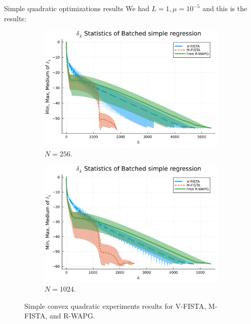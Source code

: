 \documentclass[11pt]{beamer}
\theoremstyle{definition}
\begin{document}
        \begin{frame}{Simple quadratic optimizations results}
            We had $L = 1, \mu = 10^{-5}$ and this is the results: 
            \begin{figure}[H]
                \begin{subfigure}[b]{0.47\textwidth}
                    \centering 
                    \includegraphics[width=\textwidth]{assets/simple_regression_batched-256.png}
                    \caption{$N = 256$.}
                \end{subfigure}
                \hfill
                \begin{subfigure}[b]{0.47\textwidth}
                    \centering
                    \includegraphics[width=\textwidth]{assets/simple_regression_batched-1024.png}
                    \caption{$N = 1024$.}
                \end{subfigure}
                \caption{Simple convex quadratic experiments results for V-FISTA, M-FISTA, and R-WAPG. }
                \label{fig:simple-quadratic-NOG}
            \end{figure}
        \end{frame}
\end{document}

